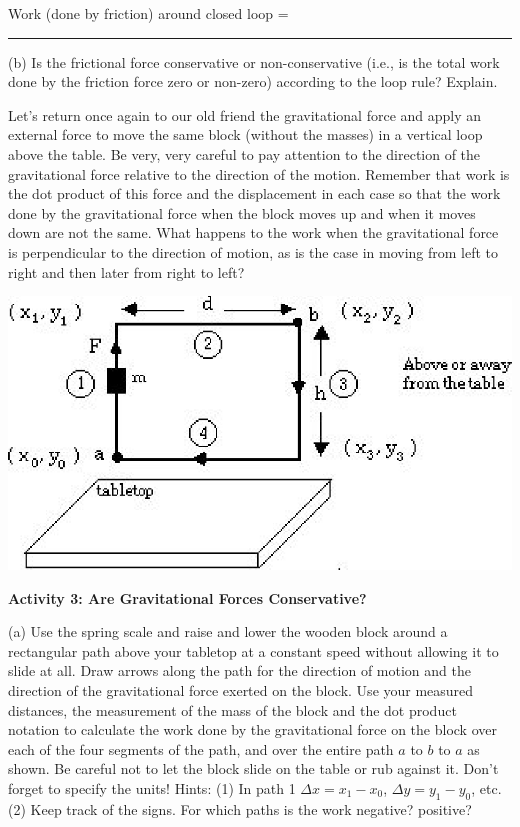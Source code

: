 \answerspace{20mm}

\hspace{1.5cm}Work (done by friction) around closed loop = \rule{1.5in}{0.1pt}

\answerspace{10mm}

(b) Is the frictional force conservative or non-conservative (i.e., 
is the total work done by the friction force zero or non-zero) according to the loop rule? Explain.
\answerspace{20mm}


Let's return once again to our old friend the gravitational force and apply
an external force to move the same block (without the masses) in a vertical
loop above the table. Be very, very careful to pay attention to the direction
of the gravitational force relative to the direction of the motion. Remember
that work is the dot product of this force and the displacement in each case
so that the work done by the gravitational force when the block moves up and
when it moves down are not the same. What happens to the work when the gravitational force is perpendicular to the direction of motion, as is the case in moving from left to right and then later from right to left?

\vspace{0.3cm}
{\par\centering \includegraphics{conservative/conservative_fig4.eps} \par}
\vspace{0.3cm}

\textbf{Activity 3: Are Gravitational Forces Conservative? }

(a) Use the spring scale and raise and lower the wooden block around a rectangular
path above your tabletop at a constant speed without allowing it to slide at
all. Draw arrows along the path for the direction of motion and the direction
of the gravitational force exerted on the block. Use your measured distances,
the measurement of the mass of the block and the dot product notation to calculate the work done by the gravitational force on the block over each of the four segments of the path, and over the entire path $a$ to $b$ to $a$ as shown. Be careful not to let the block slide on the table or rub against it. Don't forget to specify the units! Hints: (1) In path 1 
\( \Delta  x
= x_{1}  - x_{0} \), \( \Delta  y = y_{1}  - y_{0} \),
etc. (2) Keep track of the signs. For which paths is the work negative? positive?
\answerspace{40mm}

